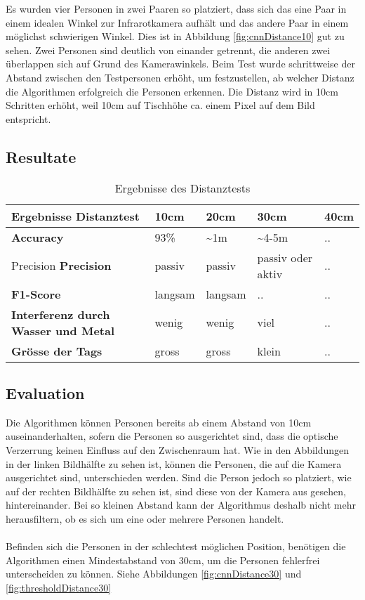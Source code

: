 Es wurden vier Personen in zwei Paaren so platziert, dass sich das eine Paar in einem idealen Winkel zur Infrarotkamera aufhält und das andere Paar in einem möglichst schwierigen Winkel. Dies ist in Abbildung \ref{fig:cnnDistance10} gut zu sehen. Zwei Personen sind deutlich von einander getrennt, die anderen zwei überlappen sich auf Grund des Kamerawinkels. Beim Test wurde schrittweise der Abstand zwischen den Testpersonen erhöht, um festzustellen, ab welcher Distanz die Algorithmen erfolgreich die Personen erkennen. Die Distanz wird in 10cm Schritten erhöht, weil 10cm auf Tischhöhe ca. einem Pixel auf dem Bild entspricht. 

\subsection{Resultate}

\begin{table}[H]
	\begin{tabularx}{\textwidth}{|X|X|X|X|X|}
		\hline
		\textbf{Ergebnisse Distanztest} & \textbf{10cm} & \textbf{20cm} & \textbf{30cm} & \textbf{40cm}\\
		\hline 
		\textbf{\gls{Accuracy}} & 93\% & \textasciitilde 1m & \textasciitilde 4-5m & ..\\
		\hline  Precision
		\textbf{\gls{Precision}} & passiv & passiv & passiv oder aktiv & ..\\
		\hline
		\textbf{F1-Score} & langsam & langsam & .. & ..\\
		\hline
		\textbf{Interferenz durch Wasser und Metal} & wenig & wenig & viel & ..\\
		\hline
		\textbf{Grösse der Tags} & gross & gross & klein & ..\\
		\hline
	\end{tabularx}
	\caption{Ergebnisse des Distanztests}
	\label{tbl:distance}
\end{table}

\subsection{Evaluation}

Die Algorithmen können Personen bereits ab einem Abstand von 10cm auseinanderhalten, sofern die Personen so ausgerichtet sind, dass die optische Verzerrung keinen Einfluss auf den Zwischenraum hat. Wie in den Abbildungen in der linken Bildhälfte zu sehen ist, können die Personen, die auf die Kamera ausgerichtet sind, unterschieden werden. Sind die Person jedoch so platziert, wie auf der rechten Bildhälfte zu sehen ist, sind diese von der Kamera aus gesehen, hintereinander. Bei so kleinen Abstand kann der Algorithmus deshalb nicht mehr herausfiltern, ob es sich um eine oder mehrere Personen handelt.\\
\\
Befinden sich die Personen in der schlechtest möglichen Position, benötigen die Algorithmen einen Mindestabstand von 30cm, um die Personen fehlerfrei unterscheiden zu können. Siehe Abbildungen \ref{fig:cnnDistance30} und \ref{fig:thresholdDistance30}

